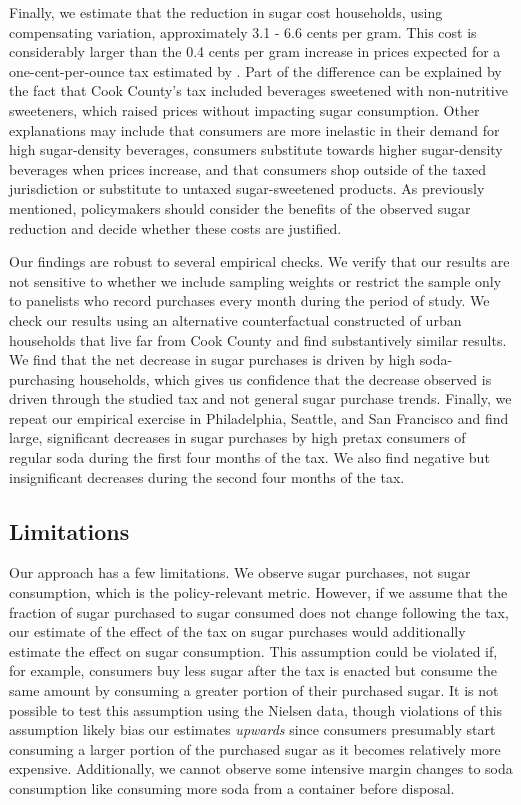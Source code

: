 \documentclass[12pt]{article}
\begin{document}
Finally, we estimate that the reduction in sugar cost households, using compensating variation, approximately 3.1 - 6.6 cents per gram. This cost is considerably larger than the 0.4 cents per gram
increase in prices expected for a one-cent-per-ounce tax estimated by \textcite{grummon2019designing}. Part of the difference can be explained by the fact that Cook County's tax included beverages sweetened with non-nutritive sweeteners, which raised prices without impacting sugar consumption. Other explanations may include that consumers are more inelastic in their demand for high sugar-density beverages, consumers substitute towards higher sugar-density beverages when prices increase, and that consumers shop outside of the taxed jurisdiction or substitute to untaxed sugar-sweetened products. As previously mentioned, policymakers should consider the benefits of the observed sugar reduction and decide whether these costs are justified.

Our findings are robust to several empirical checks. We verify that our results are not sensitive to whether we include sampling weights or restrict the sample only to panelists who record purchases every month during the period of study. We check our results using an alternative counterfactual constructed of urban households that live far from Cook County and find substantively similar results. We find that the net decrease in sugar purchases is driven by high soda-purchasing households, which gives us confidence that the decrease observed is driven through the studied tax and not general sugar purchase trends. Finally, we repeat our empirical exercise in Philadelphia, Seattle, and San Francisco and find large, significant decreases in sugar purchases by high pretax consumers of regular soda during the first four months of the tax. We also find negative but insignificant decreases during the second four months of the tax.

\subsection{Limitations}

Our approach has a few limitations. We observe sugar purchases, not sugar consumption, which is the policy-relevant metric. However, if we assume that the fraction of sugar purchased to sugar consumed does not change following the tax, our estimate of the effect of the tax on sugar purchases would additionally estimate the effect on sugar consumption. This assumption could be violated if, for example, consumers buy less sugar after the tax is enacted but consume the same amount by consuming a greater portion of their purchased sugar. It is not possible to test this assumption using the Nielsen data, though violations of this assumption likely bias our estimates \textit{upwards} since consumers presumably start consuming a larger portion of the purchased sugar as it becomes relatively more expensive. Additionally, we cannot observe some intensive margin changes to soda consumption like consuming more soda from a container before disposal.
\end{document}

